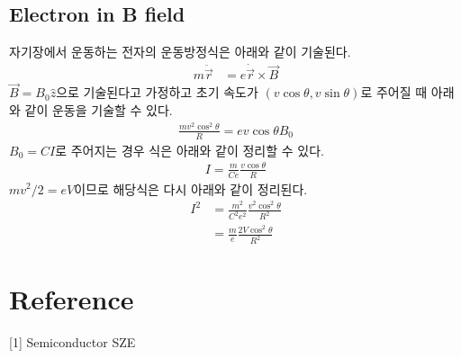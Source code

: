 \documentclass[%
 reprint,
 amsmath,amssymb,
 aps,
]{revtex4-2}
\begin{document}
\subsection{\label{sec:level2}Electron in B field}
자기장에서 운동하는 전자의 운동방정식은 아래와 같이 기술된다.
\begin{align}
	m\ddot{\vec{r}} &= e\dot{\vec{r}} \times \vec{B}
\end{align}
$\vec{B} = B_{0} \hat{z}$으로 기술된다고 가정하고 초기 속도가 $(v\cos\theta , v\sin\theta)$로 주어질 때 아래와 같이 운동을 기술할 수 있다.
\begin{align}
	\frac{mv^{2}\cos^{2}\theta}{R} = ev\cos\theta B_{0}
\end{align}
$B_{0} = CI$로 주어지는 경우 식은 아래와 같이 정리할 수 있다.
\begin{align}
	I = \frac{m}{Ce}\frac{v\cos\theta}{R}
\end{align}
$mv^{2}/2 = eV$이므로 해당식은 다시 아래와 같이 정리된다.
\begin{align}
	I^{2} &= \frac{m^{2}}{C^{2}e^{2}}\frac{v^{2}\cos^{2}\theta}{R^{2}}\\
	&= \frac{m}{e}\frac{2V\cos^{2}\theta}{R^{2}}
\end{align}

\section{\label{sec:level1}Reference}
[1] Semiconductor SZE
\end{document}
